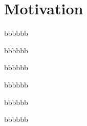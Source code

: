 \documentclass[11pt]{book}
\begin{document}
\section{Motivation}
\lipsum
\begin{theorem}
\end{theorem}

\begin{corollary}
\end{corollary}

\begin{proposition}
bbbbbb
\end{proposition}

\begin{conjecture}
bbbbbb
\end{conjecture}

\begin{lemma}
bbbbbb
\end{lemma}

\begin{definition}
bbbbbb
\end{definition}

\begin{remark}
bbbbbb
\end{remark}

\begin{assumption}
bbbbbb
\end{assumption}






\cleardoublepage%
\appendix
\pagestyle{back} %
\backmatter



\printbibliography
\nocite{*}


\listoffigures
{}

\tableofcontents%
\end{document}
